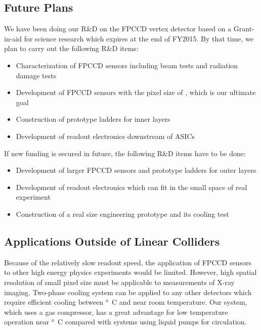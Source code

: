\subsection{Future Plans}
    We have been doing our R\&D on the FPCCD vertex detector based on a Grant-in-aid for science research which expires at the end of FY2015. By that time, we plan to carry out the following R\&D items:
\begin{itemize}
    \item Characterization of FPCCD sensors including beam tests and radiation damage tests
    \item Development of FPCCD sensors with the pixel size of \unit[5]{\micron}, which is our ultimate goal
    \item Construction of prototype ladders for inner layers
    \item Development of readout electronics downstream of ASICs
\end{itemize}
If new funding is secured in future, the following R\&D items have to be done:
\begin{itemize}
    \item Development of larger FPCCD sensors and prototype ladders for outer layers
    \item Development of readout electronics which can fit in the small space of real experiment
    \item Construction of a real size engineering prototype and its cooling test
\end{itemize}

\subsection{Applications Outside of Linear Colliders}
    Because of the relatively slow readout speed, the application of FPCCD sensors to other high energy physics experiments would be limited. However, high spatial resolution of small pixel size must be applicable to measurements of X-ray imaging.
    Two-phase  cooling system can be applied to any other detectors which require efficient cooling between \unit[-40]{\degree C} and near room temperature. Our system, which uses a  gas compressor, has a great advantage for low temperature operation near \unit[-40]{\degree C} compared with systems using liquid pumps for circulation.
